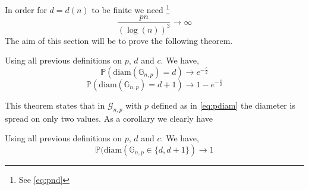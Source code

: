 In order for $d = d(n)$ to be finite we need \footnote{ See \ref{eq:pnd}}
\begin{equation}
	\frac{pn}{(\log(n))^3} \longrightarrow \infty
\end{equation}
The aim of this section will be to prove the following theorem.
\begin{theorem}\label{th:diam2}
	Using all previous definitions on $p$, $d$ and $c$. We have,
	\begin{equation}
		\mathbb{P}(\text{diam}(\mathbb{G}_{n, p}) = d) \longrightarrow e^{-\frac{c}{2}}
	\end{equation}	
	\begin{equation}
		\mathbb{P}(\text{diam}(\mathbb{G}_{n,p}) = d + 1) \longrightarrow 1 - e^{-\frac{c}{2}}
	\end{equation}
\end{theorem}
This theorem states that in $\mathcal{G}_{n,p}$ with $p$ defined as in \ref{eq:pdiam} the diameter is spread on only two values.
As a corollary we clearly have
\begin{corollary}
	Using all previous definitions on $p$, $d$ and $c$. We have,
	\begin{equation}
		\mathbb{P}(\text{diam}(\mathbb{G}_{n,p} \in \{d, d+1\}) \longrightarrow 1
	\end{equation}
\end{corollary}

